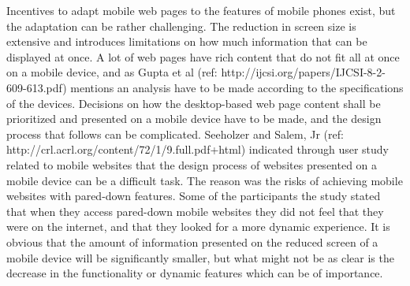 Incentives to adapt mobile web pages to the features of mobile phones exist, but the adaptation can be rather challenging. The reduction in screen size is extensive and introduces limitations on how much information that can be displayed at once. A lot of web pages have rich content that do not fit all at once on a mobile device, and as Gupta et al (ref: http://ijcsi.org/papers/IJCSI-8-2-609-613.pdf) mentions an analysis have to be made according to the specifications of the devices. Decisions on how the desktop-based web page content shall be prioritized and presented on a mobile device have to be made, and the design process that follows can be complicated. Seeholzer and Salem, Jr (ref: http://crl.acrl.org/content/72/1/9.full.pdf+html) indicated through user study related to mobile websites that the design process of websites presented on a mobile device can be a difficult task. The reason was the risks of achieving mobile websites with pared-down features. Some of the participants the study stated that when they access pared-down mobile websites they did not feel that they were on the internet, and that they looked for a more dynamic experience. It is obvious that the amount of information presented on the reduced screen of a mobile device will be significantly smaller, but what might not be as clear is the decrease in the functionality or dynamic features which can be of importance.

